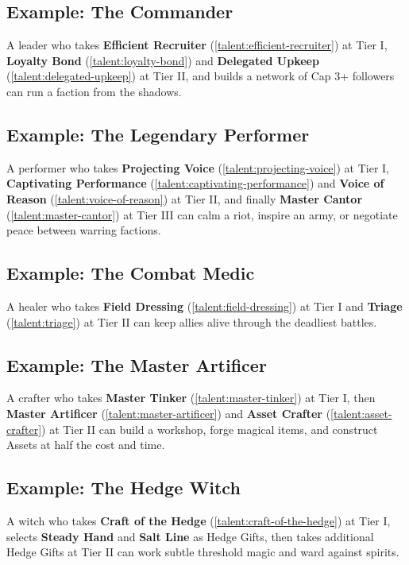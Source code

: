 \documentclass[12pt,a4paper]{book}
\begin{document}
\subsection*{Example: The Commander}
\label{sec:commander-example}
A leader who takes \textbf{Efficient Recruiter} (\ref{talent:efficient-recruiter}) at Tier I, \textbf{Loyalty Bond} (\ref{talent:loyalty-bond}) and \textbf{Delegated Upkeep} (\ref{talent:delegated-upkeep}) at Tier II, and builds a network of Cap 3+ followers can run a faction from the shadows.

\subsection*{Example: The Legendary Performer}
\label{sec:cantor-example}
A performer who takes \textbf{Projecting Voice} (\ref{talent:projecting-voice}) at Tier I, \textbf{Captivating Performance} (\ref{talent:captivating-performance}) and \textbf{Voice of Reason} (\ref{talent:voice-of-reason}) at Tier II, and finally \textbf{Master Cantor} (\ref{talent:master-cantor}) at Tier III can calm a riot, inspire an army, or negotiate peace between warring factions.

\subsection*{Example: The Combat Medic}
\label{sec:healer-example}
A healer who takes \textbf{Field Dressing} (\ref{talent:field-dressing}) at Tier I and \textbf{Triage} (\ref{talent:triage}) at Tier II can keep allies alive through the deadliest battles.

\subsection*{Example: The Master Artificer}
\label{sec:artificer-example}
A crafter who takes \textbf{Master Tinker} (\ref{talent:master-tinker}) at Tier I, then \textbf{Master Artificer} (\ref{talent:master-artificer}) and \textbf{Asset Crafter} (\ref{talent:asset-crafter}) at Tier II can build a workshop, forge magical items, and construct Assets at half the cost and time.

\subsection*{Example: The Hedge Witch}
\label{sec:witch-example}
A witch who takes \textbf{Craft of the Hedge} (\ref{talent:craft-of-the-hedge}) at Tier I, selects \textbf{Steady Hand} and \textbf{Salt Line} as Hedge Gifts, then takes additional Hedge Gifts at Tier II can work subtle threshold magic and ward against spirits.
\end{document}
